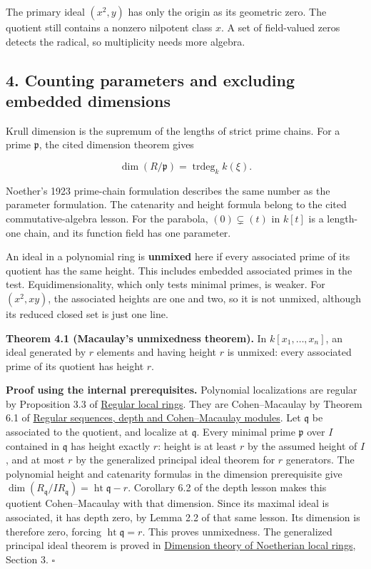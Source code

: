 \documentclass[
]{article}
\begin{document}
The primary ideal \((x^2,y)\) has only the origin as its geometric zero.
The quotient still contains a nonzero nilpotent class \(x\). A set of
field-valued zeros detects the radical, so multiplicity needs more
algebra.

\subsection{4. Counting parameters and excluding embedded
dimensions}\label{counting-parameters-and-excluding-embedded-dimensions}

Krull dimension is the supremum of the lengths of strict prime chains.
For a prime \(\mathfrak p\), the cited dimension theorem gives

\[
\dim(R/\mathfrak p)=\operatorname{trdeg}_k k(\xi).
\]

Noether's 1923 prime-chain formulation describes the same number as the
parameter formulation. The catenarity and height formula belong to the
cited commutative-algebra lesson. For the parabola, \((0)\subsetneq(t)\)
in \(k[t]\) is a length-one chain, and its function field has one
parameter.

An ideal in a polynomial ring is \textbf{unmixed} here if every
associated prime of its quotient has the same height. This includes
embedded associated primes in the test. Equidimensionality, which only
tests minimal primes, is weaker. For \((x^2,xy)\), the associated
heights are one and two, so it is not unmixed, although its reduced
closed set is just one line.

\textbf{Theorem 4.1 (Macaulay's unmixedness theorem).} In
\(k[x_1,\ldots,x_n]\), an ideal generated by \(r\) elements and having
height \(r\) is unmixed: every associated prime of its quotient has
height \(r\).

\textbf{Proof using the internal prerequisites.} Polynomial
localizations are regular by Proposition 3.3 of
\href{../prerequisites/AG-CA/AG-CA-14.html}{Regular local rings}. They
are Cohen--Macaulay by Theorem 6.1 of
\href{../prerequisites/AG-CA/AG-CA-12.html}{Regular sequences, depth and
Cohen--Macaulay modules}. Let \(\mathfrak q\) be associated to the
quotient, and localize at \(\mathfrak q\). Every minimal prime
\(\mathfrak p\) over \(I\) contained in \(\mathfrak q\) has height
exactly \(r\): height is at least \(r\) by the assumed height of \(I\),
and at most \(r\) by the generalized principal ideal theorem for \(r\)
generators. The polynomial height and catenarity formulas in the
dimension prerequisite give
\(\dim (R_{\mathfrak q}/IR_{\mathfrak q})=\operatorname{ht}\mathfrak q-r\).
Corollary 6.2 of the depth lesson makes this quotient Cohen--Macaulay
with that dimension. Since its maximal ideal is associated, it has depth
zero, by Lemma 2.2 of that same lesson. Its dimension is therefore zero,
forcing \(\operatorname{ht}\mathfrak q=r\). This proves unmixedness. The
generalized principal ideal theorem is proved in
\href{../prerequisites/AG-CA/AG-CA-11.html}{Dimension theory of
Noetherian local rings}, Section 3. \(\square\)
\end{document}
